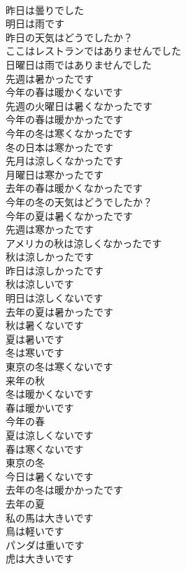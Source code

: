 \documentclass[8pt]{extreport}
\begin{document}
\begin{CJK}{UTF8}{min}
\\	昨日は曇りでした	
\\	明日は雨です	
\\	昨日の天気はどうでしたか？	
\\	ここはレストランではありませんでした	
\\	日曜日は雨ではありませんでした	
\\	先週は暑かったです	
\\	今年の春は暖かくないです	
\\	先週の火曜日は暑くなかったです	
\\	今年の春は暖かかったです	
\\	今年の冬は寒くなかったです	
\\	冬の日本は寒かったです	
\\	先月は涼しくなかったです	
\\	月曜日は寒かったです	
\\	去年の春は暖かくなかったです	
\\	今年の冬の天気はどうでしたか？	
\\	今年の夏は暑くなかったです	
\\	先週は寒かったです	
\\	アメリカの秋は涼しくなかったです	
\\	秋は涼しかったです	
\\	昨日は涼しかったです	
\\	秋は涼しいです	
\\	明日は涼しくないです	
\\	去年の夏は暑かったです	
\\	秋は暑くないです	
\\	夏は暑いです	
\\	冬は寒いです	
\\	東京の冬は寒くないです	
\\	来年の秋	
\\	冬は暖かくないです	
\\	春は暖かいです	
\\	今年の春	
\\	夏は涼しくないです	
\\	春は寒くないです	
\\	東京の冬	
\\	今日は暑くないです	
\\	去年の冬は暖かかったです	
\\	去年の夏	
\\	私の馬は大きいです	
\\	鳥は軽いです	
\\	パンダは重いです	
\\	虎は大きいです	

\end{CJK}
\end{document}
